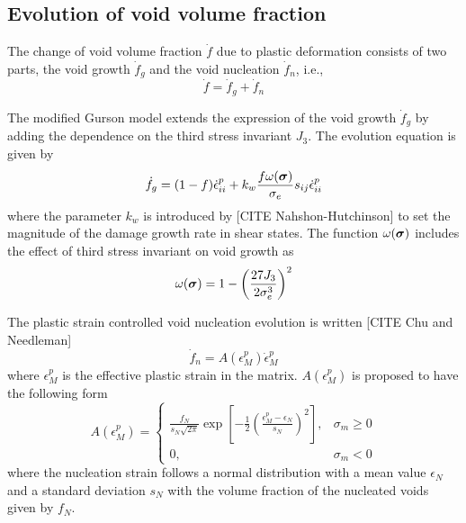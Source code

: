 \subsection{Evolution of void volume fraction}
The change of void volume fraction $\dot{f}$ due to plastic deformation consists of two parts, the void growth $\dot{f}_g$ and the void nucleation $\dot{f}_n$, i.e.,
\begin{equation}\label{eq:fdot}
\dot{f} = \dot{f}_g + \dot{f}_n
\end{equation}

The modified Gurson model extends the expression of the void growth
$\dot{f}_g$ by adding the dependence on the third stress invariant
$J_3$. The evolution equation is given by
\begin{equation}\label{eq:fgdot}
  \dot{f}_g = (1-f)\dot{\epsilon}^p_{ii} + k_w\frac{f \omega({\boldsymbol{\sigma}})}{\sigma_e}s_{ij}\dot{\epsilon}^p_{ii}
\end{equation}
where the parameter $k_w$ is introduced by [CITE Nahshon-Hutchinson]
to set the magnitude of the damage growth rate in shear states. The
function $\omega({\boldsymbol{\sigma}})$ includes the effect of third stress
invariant on void growth as
\begin{equation}
\omega({\boldsymbol{\sigma}}) = 1 - \left( \frac{27J_3}{2\sigma_e^3}\right) ^2
\end{equation}

The plastic strain controlled void nucleation evolution is written [CITE Chu and Needleman]
\begin{equation}\label{eq:fndot}
\dot{f}_n = A(\epsilon^p_M)\dot{\epsilon}^p_M
\end{equation}
where $\epsilon^p_M$ is the effective plastic strain in the matrix. $A(\epsilon^p_M)$ is proposed to have the following form
\begin{equation}
A(\epsilon^p_M) =
	\begin{cases}
		\frac{f_N}{s_N\sqrt{2\pi}}\exp\left[ -\frac{1}{2}\left( \frac{\epsilon^p_M - \epsilon_N}{s_N}\right)^2\right], & \sigma_m \geq 0\\
		0,	  & \sigma_m <0
	\end{cases}
\end{equation}
where the nucleation strain follows a normal distribution with a mean
value $\epsilon_N$ and a standard deviation $s_N$ with the volume
fraction of the nucleated voids given by $f_N$.

